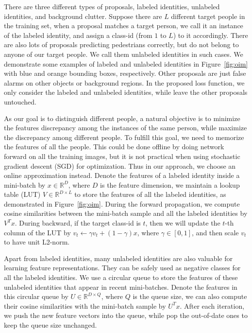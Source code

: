 \documentclass[10pt,twocolumn,letterpaper]{article}
\begin{document}
There are three different types of proposals, labeled identities, unlabeled identities, and background clutter. Suppose there are $L$ different target people in the training set, when a proposal matches a target person, we call it an instance of the labeled identity, and assign a class-id (from $1$ to $L$) to it accordingly. There are also lots of proposals predicting pedestrians correctly, but do not belong to anyone of our target people. We call them unlabeled identities in such cases. We demonstrate some examples of labeled and unlabeled identities in Figure~\ref{fig:oim} with blue and orange bounding boxes, respectively. Other proposals are just false alarms on other objects or background regions. In the proposed loss function, we only consider the labeled and unlabeled identities, while leave the other proposals untouched.

As our goal is to distinguish different people, a natural objective is to minimize the features discrepancy among the instances of the same person, while maximize the discrepancy among different people. To fulfill this goal, we need to memorize the features of all the people. This could be done offline by doing network forward on all the training images, but it is not practical when using stochastic gradient descent (SGD) for optimization. Thus in our approach, we choose an online approximation instead. Denote the features of a labeled identity inside a mini-batch by $x\in \mathbb{R}^D$, where $D$ is the feature dimension, we maintain a lookup table (LUT) $V\in \mathbb{R}^{D\times L}$ to store the features of all the labeled identities, as demonstrated in Figure~\ref{fig:oim}. During the forward propagation, we compute cosine similarities between the mini-batch sample and all the labeled identities by $V^T x$. During backward, if the target class-id is $t$, then we will update the $t$-th column of the LUT by $v_t \gets \gamma v_t + (1-\gamma) x$, where $\gamma \in [0, 1]$, and then scale $v_t$ to have unit L2-norm.

Apart from labeled identities, many unlabeled identities are also valuable for learning feature representations. They can be safely used as negative classes for all the labeled identities. We use a circular queue to store the features of these unlabeled identities that appear in recent mini-batches. Denote the features in this circular queue by $U\in \mathbb{R}^{D\times Q}$, where $Q$ is the queue size, we can also compute their cosine similarities with the mini-batch sample by $U^Tx$. After each iteration, we push the new feature vectors into the queue, while pop the out-of-date ones to keep the queue size unchanged.
\end{document}
